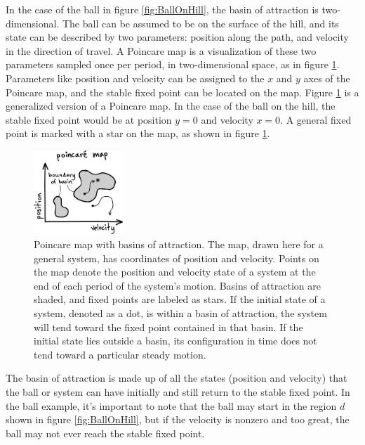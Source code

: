 In the case of the ball in figure \ref{fig:BallOnHill}, the basin of attraction
is two-dimensional. The ball can be assumed to be on the surface of the hill,
and its state can be described by two parameters: position along the path, and
velocity in the direction of travel. A Poincare map is a visualization of these
two parameters sampled once per period, in two-dimensional space, as in figure
\ref{fig:BasinOfAttraction}. Parameters like position and velocity can be
assigned to the $x$ and $y$ axes of the Poincare map, and the stable fixed
point can be located on the map. Figure \ref{fig:BasinOfAttraction} is a
generalized version of a Poincare map. In the case of the ball on the hill, the
stable fixed point would be at position $y = 0$ and velocity $x = 0$. A general
fixed point is marked with a star on the map, as shown in figure \ref{fig:BasinOfAttraction}. 

\begin{figure}[h]		%
\begin{centering}
\includegraphics[width=0.3\textwidth]{Figures/BasinOfAttraction}\par
\end{centering}
\caption[Diagram: Poincare Map with Basins of Attraction]{Poincare map with basins of attraction. The map, drawn here for a general system, has coordinates of position and velocity. Points on the map denote the position and velocity state of a system at the end of each period of the system's motion. Basins of attraction are shaded, and fixed points are labeled as stars. If the initial state of a system, denoted as a dot, is within a basin of attraction, the system will tend toward the fixed point contained in that basin. If the initial state lies outside a basin, its configuration in time does not tend toward a particular steady motion.}
\label{fig:BasinOfAttraction}
\end{figure}
%


The basin of attraction is made up of all the states (position and velocity)
that the ball or system can have initially and still return to the stable fixed
point. In the ball example, it's important to note that the ball may start in
the region $d$ shown in figure \ref{fig:BallOnHill}, but if the velocity is
nonzero and too great, the ball may not ever reach the stable fixed point. 

